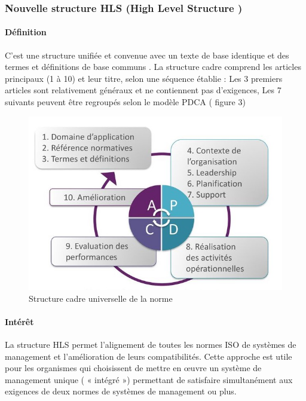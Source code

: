 \begin{spacing}{1.2}
\subsubsection{Nouvelle structure  HLS (High Level Structure )}
\paragraph{Définition}

C’est une structure unifiée et convenue avec un texte de base identique et des termes et définitions de base communs . La structure cadre comprend les articles principaux (1 à 10) et leur titre, selon une séquence établie : Les 3 premiers articles sont relativement généraux et ne contiennent pas d’exigences, Les 7 suivants peuvent être regroupés selon le modèle PDCA ( figure 3)

\begin{figure}[!ht]\centering
\includegraphics[scale=2.5]{image7.jpg}
\caption{Structure cadre universelle de la norme}
\label{fig:fig1}
\end{figure}

\paragraph{Intérêt}

La structure HLS  permet l’alignement de toutes les normes ISO de systèmes de management et l’amélioration de leurs compatibilités. Cette approche est utile pour les organismes qui choisissent de mettre en œuvre un système de management unique ( « intégré ») permettant de satisfaire simultanément aux exigences de deux normes de systèmes de management ou plus.


\end{spacing}
